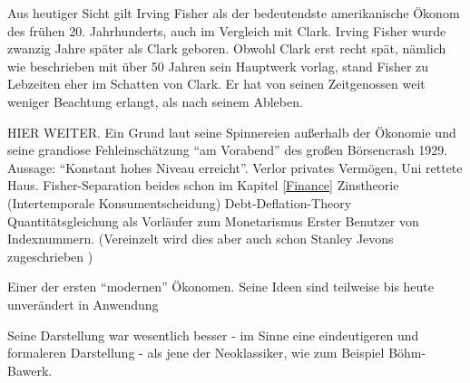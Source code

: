 Aus heutiger Sicht gilt Irving Fisher als der bedeutendste amerikanische Ökonom des frühen 20. Jahrhunderts, auch im Vergleich mit Clark. Irving Fisher wurde zwanzig Jahre später als Clark geboren. Obwohl Clark erst recht spät, nämlich wie beschrieben mit über 50 Jahren sein Hauptwerk vorlag, stand Fisher zu Lebzeiten eher im Schatten von Clark. Er hat von seinen Zeitgenossen weit weniger Beachtung erlangt, als nach seinem Ableben.

HIER WEITER.
 Ein Grund laut \textcite{Tobin1985} seine Spinnereien außerhalb der Ökonomie und seine grandiose Fehleinschätzung "`am Vorabend"' des großen Börsencrash 1929. Aussage: "`Konstant hohes Niveau erreicht"'. Verlor privates Vermögen, Uni rettete Haus.
Fisher-Separation
beides schon im Kapitel \ref{Finance}
Zinstheorie (Intertemporale Konsumentscheidung)
Debt-Deflation-Theory
Quantitätsgleichung als Vorläufer zum Monetarismus
Erster Benutzer von Indexnummern. (Vereinzelt wird dies aber auch schon Stanley Jevons zugeschrieben \parencite[S. 232]{Jevons1934})

Einer der ersten "`modernen"' Ökonomen. Seine Ideen sind teilweise bis heute unverändert in Anwendung

Seine Darstellung war wesentlich besser - im Sinne eine eindeutigeren und formaleren Darstellung - als jene der Neoklassiker, wie zum Beispiel Böhm-Bawerk.


\textcite{Tobin2005}